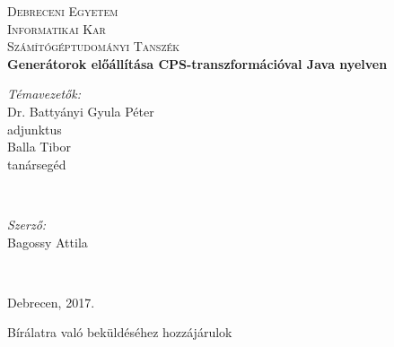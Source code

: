 %
%
%

\begin{titlepage}

\center

\textsc{\LARGE Debreceni Egyetem}\\[1.5cm]
\textsc{\Large Informatikai Kar}
\\[0.5cm]

\textsc{\large Számítógéptudományi Tanszék}
\\[2.5cm]

{\huge \bfseries Generátorok előállítása CPS-transzformációval Java nyelven}

\if{}
  \vspace*{7.5cm}

  \begin{minipage}[t]{0.4\textwidth}
    \begin{flushleft} 
      \large \textit{Témavezetők:} \\
      Dr. Battyányi Gyula Péter  \\
      adjunktus \\
      Balla Tibor \\
      tanársegéd 
      \par
    \end{flushleft}
  \end{minipage}
  ~
  \begin{minipage}[t]{0.4\textwidth}
    \begin{flushright}
      \large \textit{Szerző:}\\
      Bagossy Attila 
      \par
    \end{flushright}
  \end{minipage}
  \\[2.5cm]
\else
  \vspace*{11.5cm}
\fi

{\large Debrecen, 2017.}\\ 

\begin{flushleft}
	Bírálatra való beküldéséhez hozzájárulok
\end{flushleft}

\vfill

\end{titlepage}